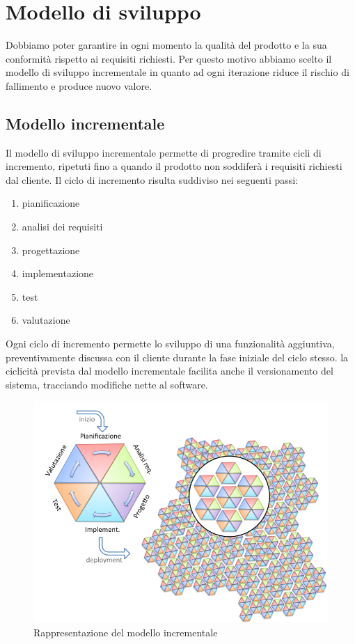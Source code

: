 \section{Modello di sviluppo}

Dobbiamo poter garantire in ogni momento la qualità del prodotto e la sua conformità rispetto ai requisiti richiesti.
Per questo motivo abbiamo scelto il modello di sviluppo incrementale in quanto ad ogni iterazione 
riduce il rischio di fallimento e produce nuovo valore.

\subsection{Modello incrementale}

Il modello di sviluppo incrementale permette di progredire tramite cicli di incremento, 
ripetuti fino a quando il prodotto non soddiferà i requisiti richiesti dal cliente.
Il ciclo di incremento risulta suddiviso nei seguenti passi:
\begin{enumerate}
    \item pianificazione
    \item analisi dei requisiti
    \item progettazione
    \item implementazione
    \item test
    \item valutazione
\end{enumerate}
Ogni ciclo di incremento permette lo sviluppo di una funzionalità aggiuntiva,
preventivamente discussa con il cliente durante la fase iniziale del ciclo stesso.
la ciclicità prevista dal modello incrementale facilita anche il versionamento del sistema,
tracciando modifiche nette al software.

\begin{figure}[H]
    \centering
    \includegraphics[scale = 0.5]{components/img/incrementale.png}
    \caption{Rappresentazione del modello incrementale}
    \label{fig:logo}
\end{figure}


